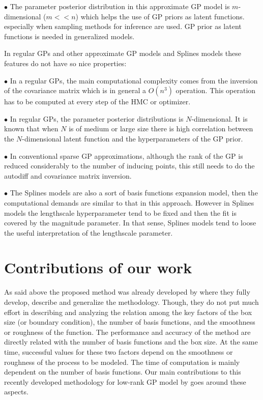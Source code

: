 \documentclass[]{interact}
\theoremstyle{plain}%
\theoremstyle{definition}
\theoremstyle{remark}
\begin{document}
\vspace{2mm}
$\bullet$ The parameter posterior distribution in this approximate GP model is $m$-dimensional ($m<<n$) which helps the use of GP priors as latent functions. especially when sampling methods for inference are used. GP prior as latent functions is needed in generalized models.

In regular GPs and other approximate GP models and Splines models these features do not have so nice properties:

\vspace{2mm}
$\bullet$ In a regular GPs, the main computational complexity comes from the inversion of the covariance matrix which is in general a $O(n^3)$ operation. This operation has to be computed at every step of the HMC or optimizer.

\vspace{2mm}
$\bullet$ In regular GPs, the parameter posterior distributions is $N$-dimensional. It is known that when $N$ is of medium or large size there is high correlation between the $N$-dimensional latent function and the hyperparameters of the GP prior.

\vspace{2mm}
$\bullet$ In conventional sparse GP approximations, although the rank of the GP is reduced considerably to the number of inducing points, this still needs to do the autodiff and covariance matrix inversion.

\vspace{2mm}
$\bullet$ The Splines models are also a sort of basis functions expansion model, then the computational demands are similar to that in this approach. However in Splines models the lengthscale hyperparameter tend to be fixed and then the fit is covered by the magnitude parameter. In that sense, Splines models tend to loose the useful interpretation of the lengthscale parameter.



\section{Contributions of our work}

As said above the proposed method was already developed by \cite{solin2018hilbert} where they fully develop, describe and generalize the methodology. Though, they do not put much effort in describing and analyzing the relation among the key factors of the box size (or boundary condition), the number of basis functions, and the smoothness or roughness of the function. The performance and accuracy of the method are directly related with the number of basis functions and the box size. At the same time, successful values for these two factors depend on the smoothness or roughness of the process to be modeled. The time of computation is mainly dependent on the number of basis functions. Our main contributions to this recently developed methodology for low-rank GP model by \cite{solin2018hilbert} goes around these aspects.
\end{document}
